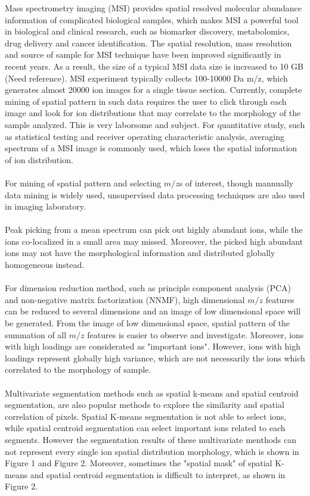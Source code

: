 \documentclass{bioinfo}
\begin{document}
Mass spectrometry imaging (MSI) provides spatial resolved molecular abundance information of complicated biological samples, which makes MSI a powerful tool in biological and clinical research, such as biomarker discovery, metabolomics, drug delivery and cancer identification. The spatial resolution, mass resolution and source of sample for MSI technique have been improved significantly in recent years. As a result, the size of a typical MSI data size is increased to 10 GB (Need reference). 
MSI experiment typically collects 100-10000 Da m/z, which generates almost 20000 ion images for a single tissue section. Currently, complete mining of spatial pattern in such data requires the user to click through each image and look for ion distributions that may correlate to the morphology of the sample analyzed. This is very laborsome and subject. For quantitative study, such as statistical testing and receiver operating characteristic analysis, averaging spectrum of a MSI image is commonly used, which loses the spatial information of ion distribution.\\
\\
For mining of spatial pattern and selecting $m/z$s of interest, though mannually data mining is widely used, unsupervised data processing techniques are also used in imaging laboratory. \\
\\
Peak picking from a mean spectrum can pick out highly abundant ions, while the ions co-localized in a small area may missed. Moreover, the picked high abundant ions may not have the morphological information and distributed globally homogeneous instead.\\
\\
For dimension reduction method, such as principle component analysis (PCA) and non-negative matrix factorization (NNMF), high dimensional $m/z$ features can be reduced to several dimensions and an image of low dimensional space will be generated. From the image of low dimensional space, spatial pattern of the summation of all $m/z$ features is easier to observe and investigate. Moreover, ions with high loadings are considerated as "important ions". However, ions with high loadings represent globally high variance, which are not necessarily the ions which correlated to the morphology of sample.\\
\\
Multivariate segmentation methods such as spatial k-means and spatial centroid segmentation, are also popular methods to explore the similarity and spatial correlation of pixels. Spatial K-means segmentation is not able to select ions, while spatial centroid segmentation can select important ions related to each segments. However the segmentation results of these multivariate menthods can not represent every single ion spatial distribution morphology, which is shown in Figure 1 and Figure 2. Moreover, sometimes the "spatial mask" of spatial K-means and spatial centroid segmentation is difficult to interpret, as shown in Figure 2.\\
\\  
\end{document}
